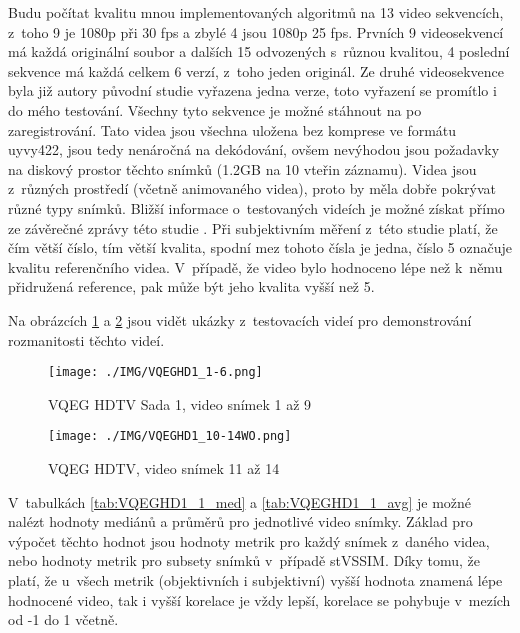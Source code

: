 \documentclass[thesis=M,czech]{FITthesis}[2016/06/26]
\begin{document}
Budu počítat kvalitu mnou implementovaných algoritmů na 13 video sekvencích, z~toho 9 je 1080p při 30 fps a zbylé 4 jsou 1080p 25 fps. Prvních 9 videosekvencí má každá originální soubor a dalších 15 odvozených s~různou kvalitou, 4 poslední sekvence má každá celkem 6 verzí, z~toho jeden originál. Ze druhé videosekvence byla již autory původní studie vyřazena jedna verze, toto vyřazení se promítlo i do mého testování. Všechny tyto sekvence je možné stáhnout na \cite{cdvl} po zaregistrování. Tato videa jsou všechna uložena bez komprese ve formátu uyvy422, jsou tedy nenáročná na dekódování, ovšem nevýhodou jsou  požadavky na diskový prostor těchto snímků (1.2GB na 10 vteřin záznamu). Videa jsou z~různých prostředí (včetně animovaného videa), proto by měla dobře pokrývat různé typy snímků. Bližší informace o~testovaných videích je možné získat přímo ze závěrečné zprávy této studie \cite{hdtv_report}. Při subjektivním měření z~této studie platí, že čím větší číslo, tím větší kvalita, spodní mez tohoto čísla je jedna, číslo 5 označuje kvalitu referenčního videa. V~případě, že video bylo hodnoceno lépe než k~němu přidružená reference, pak může být jeho kvalita vyšší než 5.  

Na obrázcích \ref{fig:VQEGHD1_1-6} a \ref{fig:VQEGHD1_10-14WO} jsou vidět ukázky z~testovacích videí pro demonstrování rozmanitosti těchto videí.
\begin{figure}[]\centering
\texttt{[image: ./IMG/VQEGHD1\_1-6.png]}
\caption{VQEG HDTV Sada 1, video snímek 1 až 9}
\label{fig:VQEGHD1_1-6}
\end{figure}
\begin{figure}[]\centering
\texttt{[image: ./IMG/VQEGHD1\_10-14WO.png]}
\caption{VQEG HDTV, video snímek 11 až 14}
\label{fig:VQEGHD1_10-14WO}
\end{figure}

V~tabulkách \ref{tab:VQEGHD1_1_med} a \ref{tab:VQEGHD1_1_avg} je možné nalézt hodnoty mediánů a průměrů pro jednotlivé video snímky. Základ pro výpočet těchto hodnot jsou hodnoty metrik pro každý snímek z~daného videa, nebo hodnoty metrik pro subsety snímků v~případě stVSSIM. Díky tomu, že platí, že u~všech metrik (objektivních i subjektivní) vyšší hodnota znamená lépe hodnocené video, tak i vyšší korelace je vždy lepší, korelace se pohybuje v~mezích od -1 do 1 včetně.
\end{document}
